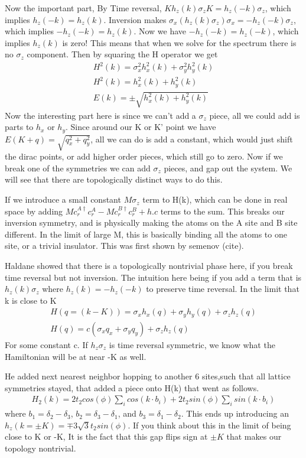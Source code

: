 Now the important part, By Time reversal, $Kh_z(k) \sigma_zK = h_z(-k)\sigma_z$, which implies $h_z(-k)=h_z(k)$. Inversion makes $\sigma_x (h_z(k) \sigma_z) \sigma_x = -h_z(-k)\sigma_z$, which implies $-h_z(-k)=h_z(k)$. Now we have $-h_z(-k)=h_z(-k)$, which implies $h_z(k)$ is zero!
This means that when we solve for the spectrum there is no $\sigma_z$ component. Then by squaring the H operator we get
\begin{align}
H^2(k)= \sigma_x^2 h_x^2(k) + \sigma_y^2 h_y^2(k) \\
H^2(k)= h_x^2(k) + h_y^2(k) \\
E(k)=\pm\sqrt{h_x^2(k) + h_y^2(k)}
\end{align}
Now the interesting part here is since we can't add a $\sigma_z$ piece, all we could add is parts to $h_x$ or $h_y$. Since around our K or K' point we have $E(K+q)=\sqrt{q_x^2+q_y^2}$, all we can do is add a constant, which would just shift the dirac points, or add higher order pieces, which still go to zero. Now if we break one of the symmetries we can add $\sigma_z$ pieces, and gap out the system. We will see that there are topologically distinct ways to do this.

If we introduce a small constant $M\sigma_z$ term to H(k), which can be done in real space by adding $Mc^{A\dagger}_rc^A_r - Mc^{B\dagger}_rc^B_r +h.c$ terms to the sum. This breaks our inversion symmetry, and is physically making the atoms on the A site and B site different. In the limit of large M, this is basically binding all the atoms to one site, or a trivial insulator. This was first shown by semenov (cite).

Haldane showed that there is a topologically nontrivial phase here, if you break time reversal but not inversion. The intuition here being if you add a term that is $h_z(k)\sigma_z$ where $h_z(k)=-h_z(-k)$ to preserve time reversal. In the limit that k is close to K
\begin{align}
H(q=(k-K))= \sigma_x h_x(q) + \sigma_y h_y(q) + \sigma_z h_z(q)\\
H(q)= c(\sigma_x q_x + \sigma_y  q_y) + \sigma_z h_z(q)
\end{align}
For some constant c. If $h_z\sigma_z$ is time reversal symmetric, we know what the Hamiltonian will be at near -K as well. 

 He added next nearest neighbor hopping to another 6 sites,such that all lattice symmetries stayed, that added a piece onto H(k) that went as follows.
\begin{align}
H_2(k) =  2t_2 cos(\phi)\sum_i cos(k \cdot b_i)  +2t_2 sin(\phi) \sum_i sin(k \cdot b_i)
\end{align} 
where $b_1 = \delta_2 - \delta_3$, $b_2 = \delta_3 - \delta_1$, and $b_3 = \delta_1-\delta_2.$ This ends up introducing an $h_z(k=\pm K) = \mp 3\sqrt{3}t_2sin(\phi)$. If you think about this in the limit of being close to K or -K, It is the fact that this gap flips sign at $\pm K$ that makes our topology nontrivial.

